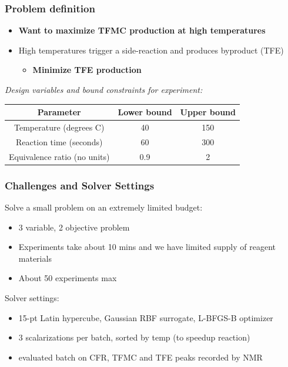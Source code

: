 \documentclass[aspectratio=169]{beamer}
\begin{document}
\begin{frame}
\frametitle{Problem definition}
  \begin{itemize}
  \item {\bf Want to maximize TFMC production at high temperatures}
  \item High temperatures trigger a side-reaction and produces byproduct (TFE)
  \begin{itemize}
    \item {\bf Minimize TFE production}
  \end{itemize}
  \end{itemize}

  \bigskip

  {\sl Design variables and bound constraints for experiment:}

  \begin{center}
  \begin{tabular}{c|cc}
      Parameter & Lower bound & Upper bound \\
      \hline
       Temperature (degrees C) & 40 & 150 \\
       Reaction time (seconds) & 60 & 300 \\
       Equivalence ratio (no units) & 0.9 & 2 \\
  \end{tabular}
  \end{center}
\end{frame}

\begin{frame}
\frametitle{Challenges and Solver Settings}
  Solve a small problem on an extremely limited budget:
  \begin{itemize}
  \item 3 variable, 2 objective problem
  \item Experiments take about 10 mins and we have limited supply of reagent materials
  \item About 50 experiments max
  \end{itemize}

  \medskip

  Solver settings:
  \begin{itemize}
  \item 15-pt Latin hypercube, Gaussian RBF surrogate, L-BFGS-B optimizer
  \item 3 scalarizations per batch, sorted by temp (to speedup reaction)
  \item evaluated batch on CFR, TFMC and TFE peaks recorded by NMR
  \end{itemize}
\end{frame}
\end{document}
